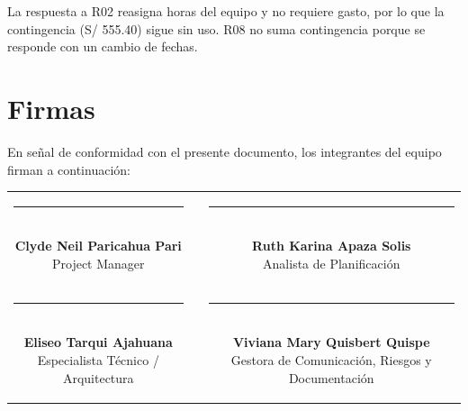 \documentclass[11pt,a4paper]{article}
\begin{document}
\vspace{0.1cm}
\noindent La respuesta a R02 reasigna horas del equipo y no requiere gasto, por lo que la contingencia (S/ 555.40) sigue sin uso. R08 no suma contingencia porque se responde con un cambio de fechas.

\section{Firmas}
\noindent En señal de conformidad con el presente documento, los integrantes del equipo firman a continuación:

\vspace{1.5cm}
\begin{center}
\begin{tabular}{c c c}
    \parbox{6.5cm}{\centering \rule{6.0cm}{0.6pt}\\[5pt] \textbf{Clyde Neil Paricahua Pari}\\[2pt] {\footnotesize Project Manager}}
    & \hspace{0.8cm} &
    \parbox{6.5cm}{\centering \rule{6.0cm}{0.6pt}\\[5pt] \textbf{Ruth Karina Apaza Solis}\\[2pt] {\footnotesize Analista de Planificación}}
    \\[2.0cm]
    \parbox{6.5cm}{\centering \rule{6.0cm}{0.6pt}\\[5pt] \textbf{Eliseo Tarqui Ajahuana}\\[2pt] {\footnotesize Especialista Técnico / Arquitectura}}
    & \hspace{0.8cm} &
    \parbox{6.5cm}{\centering \rule{6.0cm}{0.6pt}\\[5pt] \textbf{Viviana Mary Quisbert Quispe}\\[2pt] {\footnotesize Gestora de Comunicación, Riesgos y Documentación}}
\end{tabular}
\end{center}
\end{document}
